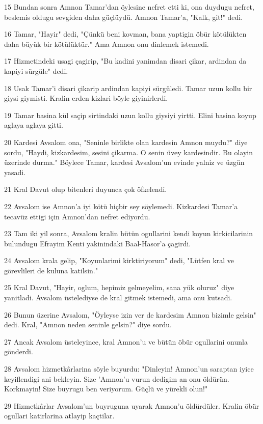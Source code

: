 \par 15 Bundan sonra Amnon Tamar'dan öylesine nefret etti ki, ona duydugu nefret, beslemis oldugu sevgiden daha güçlüydü. Amnon Tamar'a, "Kalk, git!" dedi.
\par 16 Tamar, "Hayir" dedi, "Çünkü beni kovman, bana yaptigin öbür kötülükten daha büyük bir kötülüktür." Ama Amnon onu dinlemek istemedi.
\par 17 Hizmetindeki usagi çagirip, "Bu kadini yanimdan disari çikar, ardindan da kapiyi sürgüle" dedi.
\par 18 Usak Tamar'i disari çikarip ardindan kapiyi sürgüledi. Tamar uzun kollu bir giysi giymisti. Kralin erden kizlari böyle giyinirlerdi.
\par 19 Tamar basina kül saçip sirtindaki uzun kollu giysiyi yirtti. Elini basina koyup aglaya aglaya gitti.
\par 20 Kardesi Avsalom ona, "Seninle birlikte olan kardesin Amnon muydu?" diye sordu, "Haydi, kizkardesim, sesini çikarma. O senin üvey kardesindir. Bu olayin üzerinde durma." Böylece Tamar, kardesi Avsalom'un evinde yalniz ve üzgün yasadi.
\par 21 Kral Davut olup bitenleri duyunca çok öfkelendi.
\par 22 Avsalom ise Amnon'a iyi kötü hiçbir sey söylemedi. Kizkardesi Tamar'a tecavüz ettigi için Amnon'dan nefret ediyordu.
\par 23 Tam iki yil sonra, Avsalom kralin bütün ogullarini kendi koyun kirkicilarinin bulundugu Efrayim Kenti yakinindaki Baal-Hasor'a çagirdi.
\par 24 Avsalom krala gelip, "Koyunlarimi kirktiriyorum" dedi, "Lütfen kral ve görevlileri de kuluna katilsin."
\par 25 Kral Davut, "Hayir, oglum, hepimiz gelmeyelim, sana yük oluruz" diye yanitladi. Avsalom üstelediyse de kral gitmek istemedi, ama onu kutsadi.
\par 26 Bunun üzerine Avsalom, "Öyleyse izin ver de kardesim Amnon bizimle gelsin" dedi. Kral, "Amnon neden seninle gelsin?" diye sordu.
\par 27 Ancak Avsalom üsteleyince, kral Amnon'u ve bütün öbür ogullarini onunla gönderdi.
\par 28 Avsalom hizmetkârlarina söyle buyurdu: "Dinleyin! Amnon'un saraptan iyice keyiflendigi ani bekleyin. Size 'Amnon'u vurun dedigim an onu öldürün. Korkmayin! Size buyrugu ben veriyorum. Güçlü ve yürekli olun!"
\par 29 Hizmetkârlar Avsalom'un buyruguna uyarak Amnon'u öldürdüler. Kralin öbür ogullari katirlarina atlayip kaçtilar.
